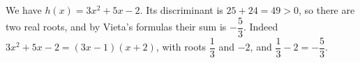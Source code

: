 We have $h(x)=3x^2+5x-2$. Its discriminant is $25+24=49>0$, so there are two real roots, and by Vieta's formulas their sum is $-\dfrac{5}{3}$. Indeed $3x^2+5x-2=(3x-1)(x+2)$, with roots $\dfrac{1}{3}$ and $-2$, and $\dfrac{1}{3}-2=\boxed{-\dfrac{5}{3}}$.
